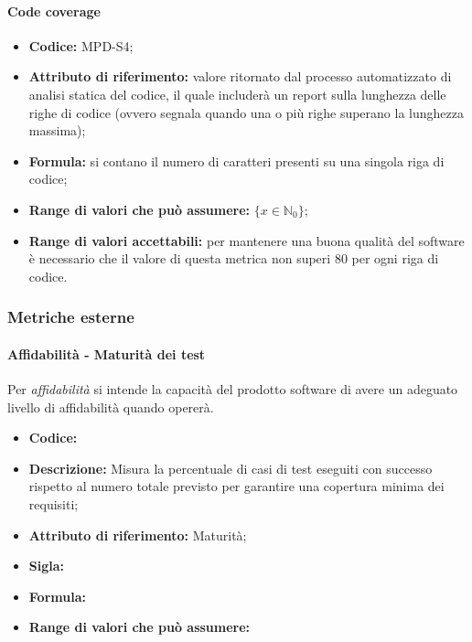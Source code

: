 \paragraph{Code coverage}
\begin{itemize}
    \item \textbf{Codice:} MPD-S4;
    \item \textbf{Attributo di riferimento:} valore ritornato dal processo automatizzato di analisi statica del codice, il quale includerà un report sulla lunghezza delle righe di codice
                                            (ovvero segnala quando una o più righe superano la lunghezza massima);
    \item \textbf{Formula:} si contano il numero di caratteri presenti su una singola riga di codice;
    \item \textbf{Range di valori che può assumere:} $\{x \in \mathbb{N}_0 \}$;
    \item \textbf{Range di valori accettabili:} per mantenere una buona qualità del software è necessario che il valore di questa metrica non superi
    80 per ogni riga di codice.
\end{itemize}


\subsubsection{Metriche esterne}

\paragraph{Affidabilità - Maturità dei test}
Per \textit{affidabilità} si intende la capacità del prodotto software di avere un adeguato livello di affidabilità quando opererà.

\begin{itemize}
    \item \textbf{Codice:} 
    \item \textbf{Descrizione:} Misura la percentuale di casi di test eseguiti con successo rispetto al numero totale previsto per garantire una copertura minima dei requisiti;
    \item \textbf{Attributo di riferimento:} Maturità;
    \item \textbf{Sigla:}
    \item \textbf{Formula:}
    \item \textbf{Range di valori che può assumere:}
\end{itemize}


